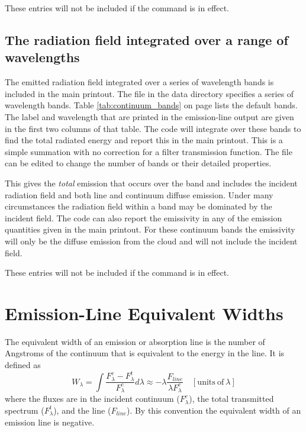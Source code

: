 These entries will not be included if the  command
is in effect.


\subsection{The radiation field integrated over a range of wavelengths}
\label{sec:Radiation-field-integrated-over-wavelengths}

The emitted
radiation field integrated over a series of wavelength bands is included
in the main printout.
The file  in the data
directory specifies a series of wavelength bands.
Table \ref{tab:continuum_bands} on page \pageref{tab:continuum_bands}
lists the default bands.
The label and wavelength
that are printed in the emission-line output are
given in the first two columns of that table.
The code
will integrate over these bands to find the total radiated
energy and report this in the main printout.
This is a simple summation with no correction for a filter transmission function.
The  file can be edited to change
the number of bands or their detailed properties.

This gives the \emph{total} emission that occurs over the band
and includes the incident radiation field and both line and continuum
diffuse emission.
Under many circumstances the radiation field within a band may be
dominated by the incident field.
The code can also report the emissivity in any of the emission
quantities given in the main printout.
For these continuum bands the emissivity will only be the
diffuse emission from the cloud and will not include the incident field.

These entries will not be included if the  command
is in effect.

\section{Emission-Line Equivalent Widths}

The equivalent width of an emission or absorption line is the number
of Angstroms of the continuum that is equivalent
to the energy in the line.
It is defined as
\begin{equation}
\label{eqn:EquivalentWidth}
W_\lambda =\int \frac{F_\lambda ^c-F_\lambda ^t}{F_\lambda ^c} d\lambda
\approx - \lambda \frac{F_{line}}{\lambda F_\lambda ^c}\quad
  [\mathrm{units\ of}~ \lambda]%
\end{equation}
where the fluxes are in the incident continuum
($F_\lambda ^c$), the total transmitted spectrum ($F_\lambda ^t$),  and the line ($F_{line}$).
By this convention the equivalent width of an
emission line is negative.

